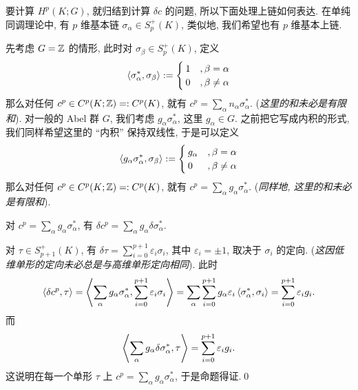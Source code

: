 要计算 $ H^p(K;G) $, 就归结到计算 $ \delta c $ 的问题, 所以下面处理上链如何表达. 在单纯同调理论中, 有 $ p $ 维基本链 $ \sigma_\alpha\in S_p^+(K) $, 类似地, 我们希望也有 $ p $ 维基本上链.

先考虑 $ G=\mathbb{Z} $ 的情形, 此时对 $ \sigma_\beta\in S_p^+(K) $, 定义
\[
	\left\langle \sigma_\alpha^*,\sigma_\beta \right\rangle:=\begin{cases}
		1 & ,\beta=\alpha \\ 0 & ,\beta\ne\alpha
	\end{cases}
\]
那么对任何 $ c^p\in C^p(K;\mathbb{Z})=:C^p(K) $, 就有 $ c^p=\sum_{\alpha}n_\alpha\sigma_\alpha^* $. (\textit{这里的和未必是有限和}). 对一般的 Abel 群 $ G $, 我们考虑 $ g_\alpha\sigma_\alpha^* $, 这里 $ g_\alpha\in G $. 之前把它写成内积的形式, 我们同样希望这里的 ``内积'' 保持双线性, 于是可以定义
\[
	\left\langle g_\alpha\sigma_\alpha^*,\sigma_\beta \right\rangle:=\begin{cases}
		g_\alpha & ,\beta=\alpha \\ 0 & ,\beta\ne\alpha
	\end{cases}
\]
那么对任何 $ c^p\in C^p(K;\mathbb{Z})=:C^p(K) $, 就有 $ c^p=\sum_{\alpha}g_\alpha\sigma_\alpha^* $. (\textit{同样地, 这里的和未必是有限和}).

\begin{Proposition}
	对 $ c^p=\sum_{\alpha}g_\alpha\sigma_\alpha^* $, 有 $ \delta c^p=\sum_{\alpha}g_\alpha\delta\sigma_\alpha^* $.
\end{Proposition}
\begin{Proof}
	对 $ \tau\in S_{p+1}^+(K) $, 有 $ \delta\tau=\sum_{i=0}^{p+1}\varepsilon_i\sigma_i $, 其中 $ \varepsilon_i=\pm 1 $, 取决于 $ \sigma_i $ 的定向. (\textit{这因低维单形的定向未必总是与高维单形定向相同}). 此时
	\[
		\left\langle \delta c^p,\tau \right\rangle=\left\langle \sum_{\alpha}g_\alpha\sigma_\alpha^*,\sum_{i=0}^{p+1}\varepsilon_i\sigma_i \right\rangle=\sum_{\alpha}\sum_{i=0}^{p+1}g_\alpha\varepsilon_i\left\langle \sigma_\alpha^*,\sigma_i \right\rangle=\sum_{i=0}^{p+1}\varepsilon_i g_i.
	\]
	而
	\[
		\left\langle \sum_{\alpha}g_\alpha\delta\sigma_\alpha^*,\tau \right\rangle=\sum_{i=0}^{p+1}\varepsilon_i g_i.
	\]
	这说明在每一个单形 $ \tau $ 上 $ c^p=\sum_{\alpha}g_\alpha\sigma_\alpha^* $, 于是命题得证.\qed
\end{Proof}

